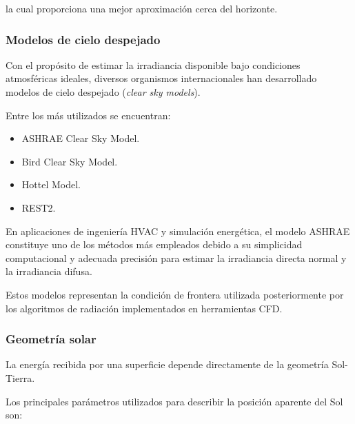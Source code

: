 la cual proporciona una mejor aproximación cerca del horizonte.


\subsubsection{Modelos de cielo despejado}

Con el propósito de estimar la irradiancia disponible bajo condiciones atmosféricas ideales, diversos organismos internacionales han desarrollado modelos de cielo despejado (\textit{clear sky models}).

Entre los más utilizados se encuentran:

\begin{itemize}

\item ASHRAE Clear Sky Model.

\item Bird Clear Sky Model.

\item Hottel Model.

\item REST2.

\end{itemize}

En aplicaciones de ingeniería HVAC y simulación energética, el modelo ASHRAE constituye uno de los métodos más empleados debido a su simplicidad computacional y adecuada precisión para estimar la irradiancia directa normal y la irradiancia difusa.

Estos modelos representan la condición de frontera utilizada posteriormente por los algoritmos de radiación implementados en herramientas CFD.


\subsubsection{Geometría solar}

La energía recibida por una superficie depende directamente de la geometría Sol-Tierra.

\clearpage

Los principales parámetros utilizados para describir la posición aparente del Sol son:

